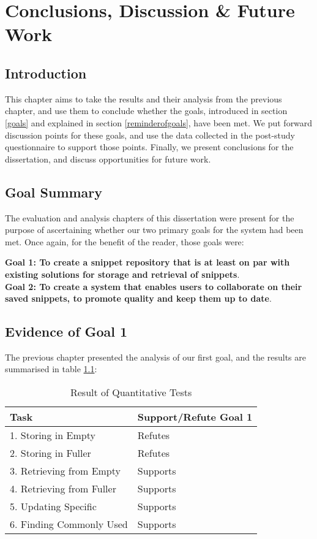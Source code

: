 \chapter{Conclusions, Discussion \& Future Work}
\section{Introduction}
This chapter aims to take the results and their analysis from the previous chapter, and use them to conclude whether the goals, introduced in section \ref{goals} and explained in section \ref{reminderofgoals}, have been met. 
We put forward discussion points for these goals, and use the data collected in the post-study questionnaire to support those points.
Finally, we present conclusions for the dissertation, and discuss opportunities for future work.

\section{Goal Summary}
The evaluation and analysis chapters of this dissertation were present for the purpose of ascertaining whether our two primary goals for the system had been met.
Once again, for the benefit of the reader, those goals were: 

\textbf{Goal 1: To create a snippet repository that is at least on par with existing solutions for storage and retrieval of snippets}. \\
\textbf{Goal 2: To create a system that enables users to collaborate on their saved snippets, to promote quality and keep them up to date}.


\section{Evidence of Goal 1}
The previous chapter presented the analysis of our first goal, and the results are summarised in table \ref{goal1evidence}:

\begin{table}[H]
\caption{Result of Quantitative Tests} \label{goal1evidence}
\begin{tabular}{ll}
\hline
\textbf{Task} & \textbf{Support/Refute Goal 1} \\ \hline
1. Storing in Empty               & Refutes   \\ 
2. Storing in Fuller                & Refutes   \\ 
3. Retrieving from Empty      & Supports \\
4. Retrieving from Fuller       & Supports \\
5. Updating Specific             & Supports \\
6. Finding Commonly Used  & Supports \\ \hline
\end{tabular}
\end{table}

